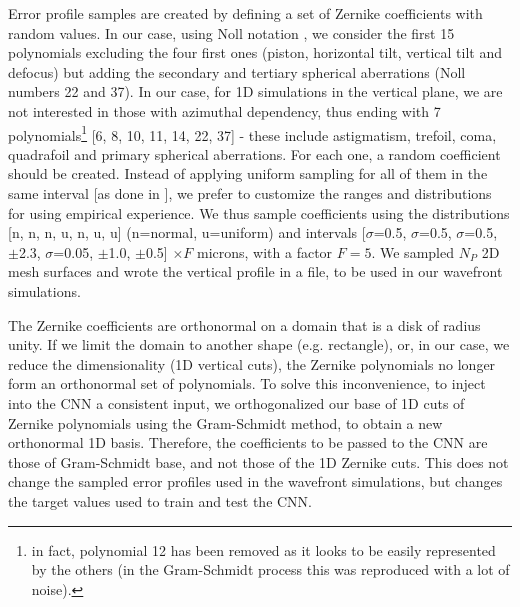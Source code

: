 \documentclass{iucr}
\newcommand{\inred}[1]{{\color{black}#1}}
\begin{document}
Error profile samples are \inred{created by} defining a set of Zernike coefficients with random values. In our case, using Noll notation \cite{Noll:76}, we consider the first 15 polynomials excluding the four first ones (piston, horizontal tilt, vertical tilt and defocus) but adding the secondary and \inred{tertiary} spherical aberrations (Noll numbers 22 and 37). In our case, for 1D simulations in the vertical plane, we are not interested in those with azimuthal dependency, thus ending with 7 polynomials\footnote{in fact, polynomial 12 has been removed as it looks to be easily represented by the others (in the Gram-Schmidt process this was reproduced with a lot of noise). } [6, 8, 10, 11, 14, 22, 37] - \inred{these include astigmatism, trefoil, coma, quadrafoil and primary spherical aberrations}. For each one, a random coefficient should be created. Instead of applying uniform sampling for all of them in the same interval [as done in \cite{Saha2020}], we prefer to customize the ranges and distributions for using empirical experience. We thus sample coefficients using the distributions [n, n, n, u, n, u, u]  (n=normal, u=uniform) and intervals [$\sigma$=0.5, $\sigma$=0.5, $\sigma$=0.5, $\pm$2.3, $\sigma$=0.05, $\pm$1.0, $\pm$0.5] $\times F$ microns, with a factor $F=5$. We sampled $N_P$ 2D mesh surfaces and wrote the vertical profile in a file, to be used in our wavefront simulations.

The Zernike coefficients are orthonormal on a domain that is a disk of radius unity. If we limit the domain to another shape (e.g. rectangle), or, in our case, we reduce the dimensionality (1D vertical cuts), the Zernike polynomials no longer form an orthonormal set of polynomials. To solve this inconvenience, to inject into the CNN a consistent input, we orthogonalized our base of 1D cuts of Zernike polynomials using the Gram-Schmidt method, to obtain a new orthonormal 1D basis. Therefore, the coefficients to be passed to the CNN are those of Gram-Schmidt base, and not those of the 1D Zernike cuts. This does not change the sampled error profiles used in the wavefront simulations, but changes the target values used to train and test the CNN.  
\end{document}
